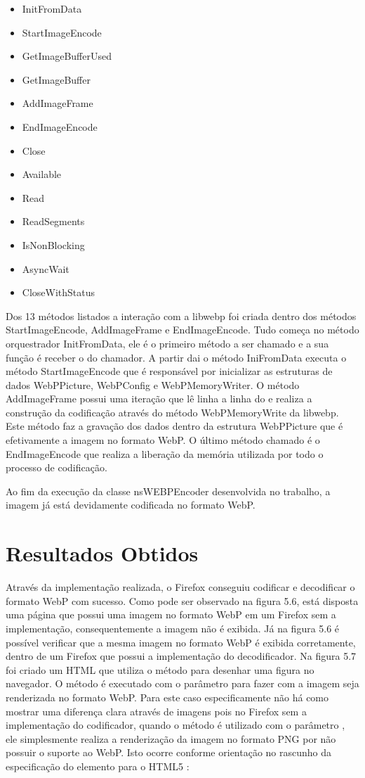 \documentclass[espaco=simples,appendix=Name]{abnt}
\begin{document}
\begin{itemize}
	\item InitFromData
	\item StartImageEncode
	\item GetImageBufferUsed
	\item GetImageBuffer
	\item AddImageFrame
	\item EndImageEncode
	\item Close
	\item Available
	\item Read
	\item ReadSegments
	\item IsNonBlocking
	\item AsyncWait
	\item CloseWithStatus
\end{itemize}

Dos 13 métodos listados a interação com a libwebp foi criada dentro dos métodos StartImageEncode, AddImageFrame e EndImageEncode. Tudo começa no método orquestrador InitFromData, ele é o primeiro método a ser chamado e a sua função é receber o  do chamador. A partir dai o método IniFromData executa o método StartImageEncode que é responsável por inicializar as estruturas de dados WebPPicture, WebPConfig e WebPMemoryWriter. O método AddImageFrame possui uma iteração que lê linha a linha do  e realiza a construção da codificação através do método WebPMemoryWrite da libwebp. Este método faz a gravação dos dados dentro da estrutura WebPPicture que é efetivamente a imagem no formato WebP. O último método chamado é o EndImageEncode que realiza a liberação da memória utilizada por todo o processo de codificação.

Ao fim da execução da classe nsWEBPEncoder desenvolvida no trabalho, a imagem já está devidamente codificada no formato WebP.

\section{Resultados Obtidos}

Através da implementação realizada, o Firefox conseguiu codificar e decodificar o formato WebP com sucesso. Como pode ser observado na figura 5.6, está disposta uma página que possui uma imagem no formato WebP em um Firefox sem a implementação, consequentemente a imagem não é exibida. Já na figura 5.6 é possível verificar que a mesma imagem no formato WebP é exibida corretamente, dentro de um Firefox que possui a implementação do decodificador. Na figura 5.7 foi criado um HTML que utiliza o método  para desenhar uma figura no navegador. O método  é executado com o parâmetro  para fazer com a imagem seja renderizada no formato WebP. Para este caso especificamente não há como mostrar uma diferença clara através de imagens pois no Firefox sem a implementação do codificador, quando o método  é utilizado com o parâmetro , ele simplesmente realiza a renderização da imagem no formato PNG por não possuir o suporte ao WebP. Isto ocorre conforme orientação no rascunho da especificação do elemento  para o HTML5 \cite{CanvasElement}:
\end{document}
